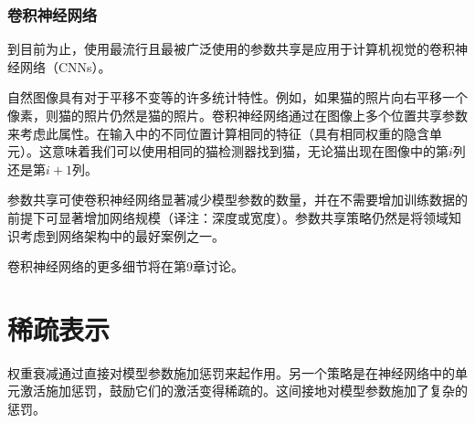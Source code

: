 \subsubsection{卷积神经网络}

到目前为止，使用最流行且最被广泛使用的参数共享是应用于计算机视觉的卷积神经网络（CNNs）。

自然图像具有对于平移不变等的许多统计特性。例如，如果猫的照片向右平移一个像素，则猫的照片仍然是猫的照片。卷积神经网络通过在图像上多个位置共享参数来考虑此属性。在输入中的不同位置计算相同的特征（具有相同权重的隐含单元）。这意味着我们可以使用相同的猫检测器找到猫，无论猫出现在图像中的第$i$列还是第$i + 1$列。

参数共享可使卷积神经网络显著减少模型参数的数量，并在不需要增加训练数据的前提下可显著增加网络规模（译注：深度或宽度）。参数共享策略仍然是将领域知识考虑到网络架构中的最好案例之一。

卷积神经网络的更多细节将在第9章讨论。

\section{稀疏表示}

权重衰减通过直接对模型参数施加惩罚来起作用。另一个策略是在神经网络中的单元激活施加惩罚，鼓励它们的激活变得稀疏的。这间接地对模型参数施加了复杂的惩罚。

